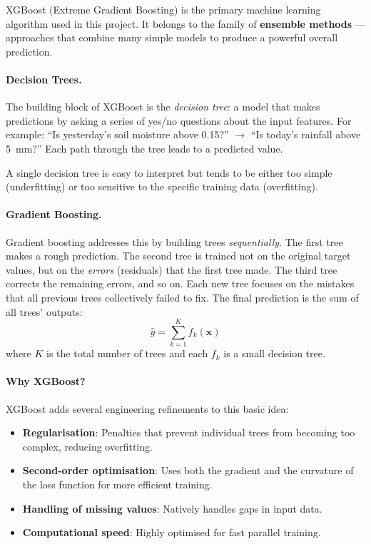 \documentclass[12pt, a4paper]{article}
\begin{document}
XGBoost (Extreme Gradient Boosting) is the primary machine learning algorithm used in this project. It belongs to the family of \textbf{ensemble methods} --- approaches that combine many simple models to produce a powerful overall prediction.

\paragraph{Decision Trees.} The building block of XGBoost is the \textit{decision tree}: a model that makes predictions by asking a series of yes/no questions about the input features. For example: ``Is yesterday's soil moisture above 0.15?'' $\rightarrow$ ``Is today's rainfall above 5~mm?'' Each path through the tree leads to a predicted value.

A single decision tree is easy to interpret but tends to be either too simple (underfitting) or too sensitive to the specific training data (overfitting).

\paragraph{Gradient Boosting.} Gradient boosting addresses this by building trees \textit{sequentially}. The first tree makes a rough prediction. The second tree is trained not on the original target values, but on the \textit{errors} (residuals) that the first tree made. The third tree corrects the remaining errors, and so on. Each new tree focuses on the mistakes that all previous trees collectively failed to fix. The final prediction is the sum of all trees' outputs:
\[
\hat{y} = \sum_{k=1}^{K} f_k(\mathbf{x})
\]
where $K$ is the total number of trees and each $f_k$ is a small decision tree.

\paragraph{Why XGBoost?} XGBoost adds several engineering refinements to this basic idea:
\begin{itemize}
    \item \textbf{Regularisation}: Penalties that prevent individual trees from becoming too complex, reducing overfitting.
    \item \textbf{Second-order optimisation}: Uses both the gradient and the curvature of the loss function for more efficient training.
    \item \textbf{Handling of missing values}: Natively handles gaps in input data.
    \item \textbf{Computational speed}: Highly optimised for fast parallel training.
\end{itemize}
\end{document}
